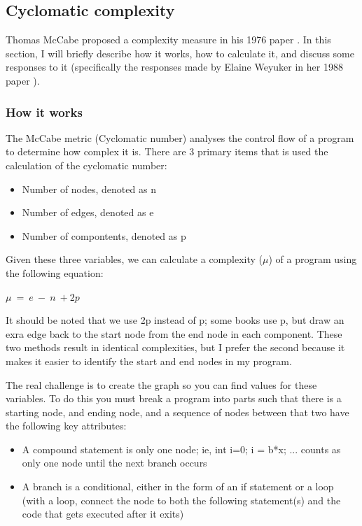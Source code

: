 \documentclass[]{article}
\begin{document}
\subsection{Cyclomatic complexity}

Thomas McCabe proposed a complexity measure in his 1976 paper \cite{ref:a_complexity_measure}.
In this section, I will briefly describe how it works, how to calculate it, and discuss some responses to it (specifically the responses made by  Elaine Weyuker in her 1988 paper \cite{ref:evaluating_software_complexity_measures}).

\subsubsection{How it works}

The McCabe metric (Cyclomatic number) analyses the control flow of a program to determine how complex it is. 
There are 3 primary items that is used the calculation of the cyclomatic number:
\begin{itemize}
	\item Number of nodes, denoted as n
	\item Number of edges, denoted as e
	\item Number of compontents, denoted as p
\end{itemize}

Given these three variables, we can calculate a complexity ($\mu$) of a program using the following equation:

$\mu ~= ~e ~- ~n ~+ 2p$

It should be noted that we use 2p instead of p; some books use p, but draw an exra edge back to the start node from the end node in each component.
These two methods result in identical complexities, but I prefer the second because it makes it easier to identify the start and end nodes in my program.

The real challenge is to create the graph so you can find values for these variables.
To do this you must break a program into parts such that there is a starting node, and ending node, and a sequence of nodes between that two have the following key attributes:
\begin{itemize}
	\item A compound statement is only one node; ie, int i=0; i = b*x; ... counts as only one node until the next branch occurs
	\item A branch is a conditional, either in the form of an if statement or a loop (with a loop, connect the node to both the following statement(s) and the code that gets executed after it exits)
\end{itemize}
\end{document}
